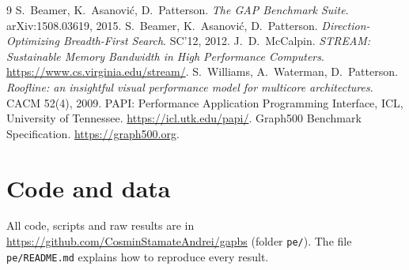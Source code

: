 \documentclass[11pt,a4paper]{article}
\begin{document}
\begin{thebibliography}{9}
 S.~Beamer, K.~Asanović, D.~Patterson. \emph{The GAP Benchmark Suite}. arXiv:1508.03619, 2015.
 S.~Beamer, K.~Asanović, D.~Patterson. \emph{Direction-Optimizing Breadth-First Search}. SC'12, 2012.
 J.~D.~McCalpin. \emph{STREAM: Sustainable Memory Bandwidth in High Performance Computers}. \url{https://www.cs.virginia.edu/stream/}.
 S.~Williams, A.~Waterman, D.~Patterson. \emph{Roofline: an insightful visual performance model for multicore architectures}. CACM 52(4), 2009.
 PAPI: Performance Application Programming Interface, ICL, University of Tennessee. \url{https://icl.utk.edu/papi/}.
 Graph500 Benchmark Specification. \url{https://graph500.org}.
\end{thebibliography}

\appendix
\section*{Code and data}
All code, scripts and raw results are in \url{https://github.com/CosminStamateAndrei/gapbs}
(folder \texttt{pe/}). The file \texttt{pe/README.md} explains how to reproduce every result.
\end{document}
